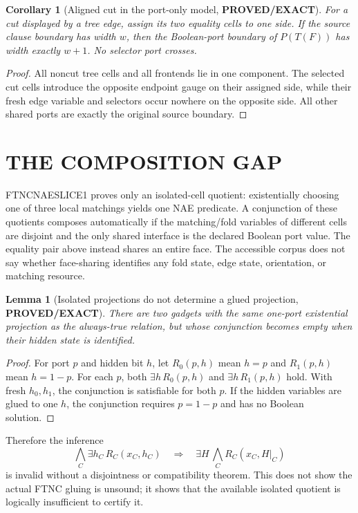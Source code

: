\documentclass[11pt]{article}
\newtheorem{lemma}[theorem]{Lemma}
\newtheorem{corollary}[theorem]{Corollary}
\newcommand{\EXACT}{\textbf{PROVED/EXACT}}
\begin{document}
\begin{corollary}[Aligned cut in the port-only model, \EXACT]
For a cut displayed by a tree edge, assign its two equality cells to one
side.  If the source clause boundary has width $w$, then the Boolean-port
boundary of $P(T(F))$ has width exactly $w+1$.  No selector port crosses.
\end{corollary}
\begin{proof}
All noncut tree cells and all frontends lie in one component.  The selected
cut cells introduce the opposite endpoint gauge on their assigned side, while
their fresh edge variable and selectors occur nowhere on the opposite side.
All other shared ports are exactly the original source boundary.
\end{proof}

\section{THE COMPOSITION GAP}
FTNCNAESLICE1 proves only an isolated-cell quotient: existentially choosing one
of three local matchings yields one NAE predicate.  A conjunction of these
quotients composes automatically if the matching/fold variables of different
cells are disjoint and the only shared interface is the declared Boolean port
value.  The equality pair above instead shares an entire face.  The accessible
corpus does not say whether face-sharing identifies any fold state, edge state,
orientation, or matching resource.

\begin{lemma}[Isolated projections do not determine a glued projection,
\EXACT]
There are two gadgets with the same one-port existential projection as the
always-true relation, but whose conjunction becomes empty when their hidden
state is identified.
\end{lemma}
\begin{proof}
For port $p$ and hidden bit $h$, let $R_0(p,h)$ mean $h=p$ and $R_1(p,h)$ mean
$h=1-p$.  For each $p$, both $\exists h\,R_0(p,h)$ and
$\exists h\,R_1(p,h)$ hold.  With fresh $h_0,h_1$, the conjunction is
satisfiable for both $p$.  If the hidden variables are glued to one $h$, the
conjunction requires $p=1-p$ and has no Boolean solution.
\end{proof}

Therefore the inference
\[
 \bigwedge_C \exists h_C\,R_C(x_C,h_C)
 \quad\Longrightarrow\quad
 \exists H\,\bigwedge_C R_C(x_C,H|_C)
\]
is invalid without a disjointness or compatibility theorem.  This does not
show the actual FTNC gluing is unsound; it shows that the available isolated
quotient is logically insufficient to certify it.
\end{document}
